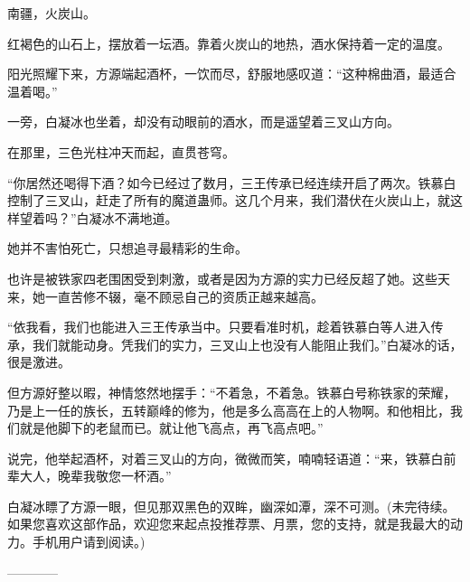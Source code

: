 \begin{this_body}
南疆，火炭山。

红褐色的山石上，摆放着一坛酒。靠着火炭山的地热，酒水保持着一定的温度。

阳光照耀下来，方源端起酒杯，一饮而尽，舒服地感叹道：“这种棉曲酒，最适合温着喝。”

一旁，白凝冰也坐着，却没有动眼前的酒水，而是遥望着三叉山方向。

在那里，三色光柱冲天而起，直贯苍穹。

“你居然还喝得下酒？如今已经过了数月，三王传承已经连续开启了两次。铁慕白控制了三叉山，赶走了所有的魔道蛊师。这几个月来，我们潜伏在火炭山上，就这样望着吗？”白凝冰不满地道。

她并不害怕死亡，只想追寻最精彩的生命。

也许是被铁家四老围困受到刺激，或者是因为方源的实力已经反超了她。这些天来，她一直苦修不辍，毫不顾忌自己的资质正越来越高。

“依我看，我们也能进入三王传承当中。只要看准时机，趁着铁慕白等人进入传承，我们就能动身。凭我们的实力，三叉山上也没有人能阻止我们。”白凝冰的话，很是激进。

但方源好整以暇，神情悠然地摆手：“不着急，不着急。铁慕白号称铁家的荣耀，乃是上一任的族长，五转巅峰的修为，他是多么高高在上的人物啊。和他相比，我们就是他脚下的老鼠而已。就让他飞高点，再飞高点吧。”

说完，他举起酒杯，对着三叉山的方向，微微而笑，喃喃轻语道：“来，铁慕白前辈大人，晚辈我敬您一杯酒。”

白凝冰瞟了方源一眼，但见那双黑色的双眸，幽深如潭，深不可测。(未完待续。如果您喜欢这部作品，欢迎您来起点投推荐票、月票，您的支持，就是我最大的动力。手机用户请到阅读。)

------------

\end{this_body}

